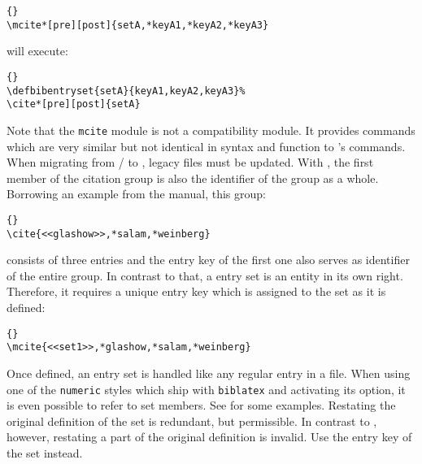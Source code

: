 \begin{lstlisting}[style=latex]{}
\mcite*[pre][post]{setA,*keyA1,*keyA2,*keyA3}
\end{lstlisting}
%
will execute:

\begin{lstlisting}[style=latex]{}
\defbibentryset{setA}{keyA1,keyA2,keyA3}%
\cite*[pre][post]{setA}
\end{lstlisting}
%
Note that the \texttt{mcite} module is not a compatibility module. It provides commands which are very similar but not identical in syntax and function to 's commands. When migrating from \slash{} to \biblatex, legacy files must be updated. With , the first member of the citation group is also the identifier of the group as a whole. Borrowing an example from the  manual, this group:

\begin{table}
\tablesetup
{}
\caption{-like commands}
\label{use:cit:mct:tab1}
\end{table}

\begin{lstlisting}[style=latex]{}
\cite{<<glashow>>,*salam,*weinberg}
\end{lstlisting}
%
consists of three entries and the entry key of the first one also serves as identifier of the entire group. In contrast to that, a \biblatex entry set is an entity in its own right. Therefore, it requires a unique entry key which is assigned to the set as it is defined:

\begin{lstlisting}[style=latex]{}
\mcite{<<set1>>,*glashow,*salam,*weinberg}
\end{lstlisting}
%
Once defined, an entry set is handled like any regular entry in a  file. When using one of the \texttt{numeric} styles which ship with \texttt{biblatex} and activating its  option, it is even possible to refer to set members. See  for some examples. Restating the original definition of the set is redundant, but permissible. In contrast to , however, restating a part of the original definition is invalid. Use the entry key of the set instead.


